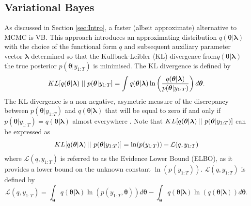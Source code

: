 \documentclass[12pt,a4paper]{article}%
\numberwithin{equation}{section}
\begin{document}
\subsection{Variational Bayes} \label{sec:VB}

As discussed in Section \ref{sec:Intro}, a faster (albeit approximate) alternative to MCMC is VB. This approach introduces an approximating distribution $q(\boldsymbol{\theta} | \boldsymbol{\lambda})$ with the choice of the functional form $q$ and subsequent auxiliary parameter vector $\boldsymbol{\lambda}$ determined so that the Kullback-Leibler (KL) divergence \citep{Kullback1951} from$q(\boldsymbol{\theta} | \boldsymbol{\lambda})$ the true posterior $p(\boldsymbol{\theta} | y_{1:T})$ is minimised. The KL divergence is defined by
\begin{equation}
\label{KL-def}
KL[q(\boldsymbol{\theta} | \boldsymbol{\lambda})\hspace{.1cm}||\hspace{.1cm}p(\boldsymbol{\theta} | y_{1:T}] = \int q(\boldsymbol{\theta} | \boldsymbol{\lambda}) \ln \left( \frac{q(\boldsymbol{\theta} | \boldsymbol{\lambda})}{p(\boldsymbol{\theta} |y_{1:T})}\right) d\boldsymbol{\theta}.
\end{equation}
The KL divergence is a non-negative, asymetric measure of the discrepancy between $p(\boldsymbol{\theta} | y_{1:T})$ and $q(\boldsymbol{\theta} | \boldsymbol{\lambda})$  that will be equal to zero if and only if $p(\boldsymbol{\theta} | y_{1:T}) = q(\boldsymbol{\theta} | \boldsymbol{\lambda})$ almost everywhere \citep{Bishop2006}. Note that $KL[q(\boldsymbol{\theta} | \boldsymbol{\lambda})\hspace{.1cm}||\hspace{.1cm}p(\boldsymbol{\theta} | y_{1:T})]$ can be expressed as
\begin{equation}
\label{KL-ELBO}
KL[q(\boldsymbol{\theta} | \boldsymbol{\lambda})\hspace{.1cm}||\hspace{.1cm}p(\boldsymbol{\theta} | y_{1:T})] = \ln(p(y_{1:T})) - \mathcal{L}(q, y_{1:T})
\end{equation}
where $\mathcal{L}(q, y_{1:T})$ is referred to as the Evidence Lower Bound (ELBO), as it provides a lower bound on the unknown constant $\ln(p(y_{1:T}))$.  $\mathcal{L}(q, y_{1:T})$ is defined by
\begin{equation}
\label{ELBO}
\mathcal{L}(q, y_{1:T}) = \int_{\boldsymbol{\theta}} q(\boldsymbol{\theta} | \boldsymbol{\lambda}) \ln (p(y_{1:T},\boldsymbol{\theta})) d\boldsymbol{\theta} -  \int_{\boldsymbol{\theta}} q(\boldsymbol{\theta} | \boldsymbol{\lambda}) \ln (q(\boldsymbol{\theta} | \boldsymbol{\lambda})) d\boldsymbol{\theta}.
\end{equation}
\end{document}
